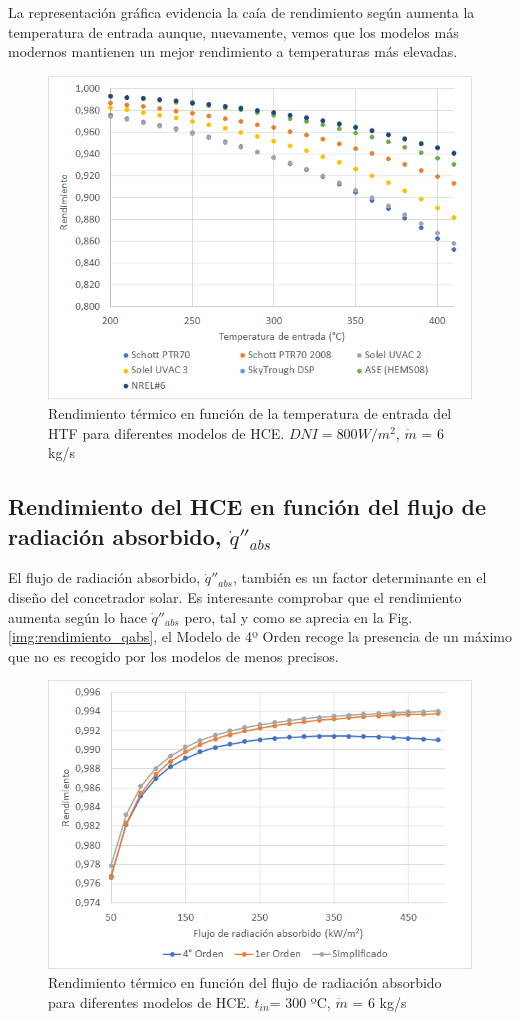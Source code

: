 La representación gráfica evidencia la caía de rendimiento según aumenta la temperatura de entrada aunque, nuevamente, vemos que los modelos más modernos mantienen un mejor rendimiento a temperaturas más elevadas.

\begin{figure}[H]
\includegraphics[width=0.9\linewidth]{images/rendimiento_temperatura.png}
\caption{Rendimiento térmico en función de la temperatura de entrada del HTF para diferentes modelos de HCE. $DNI= 800 W/m^2$, $\dot m$ = 6 kg/s} 
\label{fig:test2a}
\end{figure}


\subsection{Rendimiento del HCE en función del flujo de radiación absorbido, $\dot q''_{abs}$}

El flujo de radiación absorbido, $\dot q''_{abs}$,  también es un factor determinante en el diseño del concetrador solar. Es interesante comprobar que el rendimiento aumenta según lo hace $\dot q''_{abs}$ pero, tal y como se aprecia en la Fig. \ref{img:rendimiento_qabs}, el Modelo de 4º Orden recoge la presencia de un máximo que no es recogido por los modelos de menos precisos.  

\begin{figure}[H]
\includegraphics[width=0.9\linewidth]{images/rendimiento_qabs.png}
\caption{Rendimiento térmico en función del flujo de radiación absorbido para diferentes modelos de HCE. $t_{in}$= 300 ºC, $\dot m$ = 6 kg/s} 
\label{fig:rendimiento_qabs}
\end{figure}

